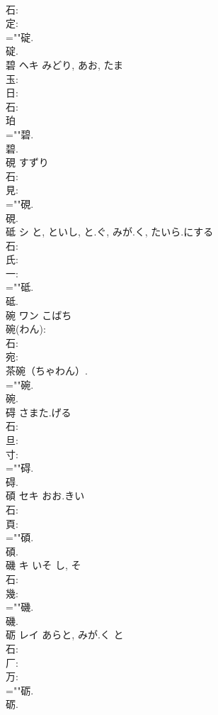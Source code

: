 \documentclass[8pt]{extreport}
\begin{document}
\begin{CJK}{UTF8}{min}
\\	石: 
\\	定: 
\\	=""碇.
\\	碇.
\\	碧	ヘキ		みどり, あお, たま	
\\	玉: 
\\	日: 
\\	石: 
\\	珀 
\\	=""碧.
\\	碧.
\\	硯		すずり				
\\	石: 
\\	見: 
\\	=""硯.
\\	硯.
\\	砥	シ	と, といし, と.ぐ, みが.く, たいら.にする		
\\	石: 
\\	氏: 
\\	一: 
\\	=""砥.
\\	砥.
\\	碗	ワン	こばち		
\\	碗(わん): 
\\	石: 
\\	宛: 
\\	茶碗（ちゃわん）. 
\\	=""碗.
\\	碗.
\\	碍		さまた.げる				
\\	石: 
\\	旦: 
\\	寸: 
\\	=""碍.
\\	碍.
\\	碩	セキ	おお.きい		
\\	石: 
\\	頁: 
\\	=""碩.
\\	碩.
\\	磯	キ	いそ	し, そ	
\\	石: 
\\	幾: 
\\	=""磯.
\\	磯.
\\	砺	レイ	あらと, みが.く	と	
\\	石: 
\\	厂: 
\\	万: 
\\	=""砺.
\\	砺.

\end{CJK}
\end{document}
